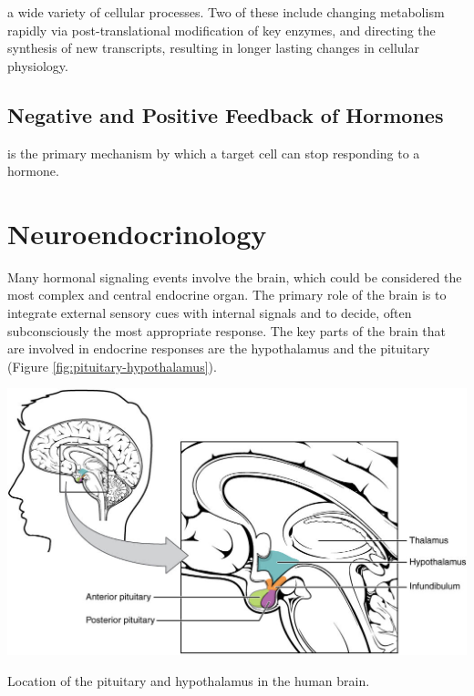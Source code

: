 \documentclass{tufte-handout}
\begin{document}
 a wide variety of cellular processes.  Two of these include changing metabolism rapidly via post-translational modification of key enzymes, and directing the synthesis of new transcripts, resulting in longer lasting changes in cellular physiology.


\subsection{Negative and Positive Feedback of Hormones}

 is the primary mechanism by which a target cell can stop responding to a hormone.  




\section{Neuroendocrinology}

Many hormonal signaling events involve the brain, which could be considered the most complex and central endocrine organ.  The primary role of the brain is to integrate external sensory cues with internal signals and to decide, often subconsciously the most appropriate response.  The key parts of the brain that are involved in endocrine responses are the hypothalamus and the pituitary (Figure \ref{fig:pituitary-hypothalamus}).

\begin{marginfigure}
  \includegraphics{figures/pituitary-hypothalamus}
  \caption{Location of the pituitary and hypothalamus in the human brain.}
    \label{fig:pituitary-hypothalamus}
\end{marginfigure}
\end{document}
